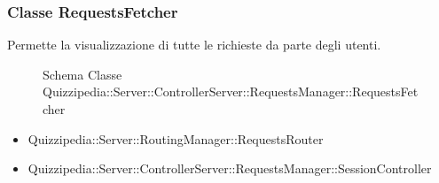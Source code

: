 \subsubsection{Classe RequestsFetcher}
Permette la visualizzazione di tutte le richieste da parte degli utenti.
\begin{figure}[H]
\centering
\noindent{}
\caption[Schema Classe RequestsFetcher]{Schema Classe Quizzipedia::Server::ControllerServer::RequestsManager::RequestsFetcher}
\end{figure}
\begin{itemize}
\item Quizzipedia::Server::RoutingManager::RequestsRouter
\end{itemize}
\begin{itemize}
\item Quizzipedia::Server::ControllerServer::RequestsManager::SessionController
\end{itemize}
